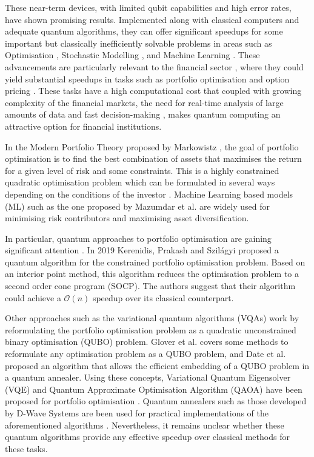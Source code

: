 \documentclass[prx,twocolumn,floatfix,superscriptaddress,longbibliography]{revtex4-1}
\begin{document}
These near-term devices, with limited qubit capabilities and high error rates, have shown promising results. Implemented along with classical computers and adequate quantum algorithms, they can offer significant speedups for some important but classically inefficiently solvable problems in areas such as Optimisation \cite{Symons2023}, Stochastic Modelling \cite{Herbert2022}, and Machine Learning \cite{Zeguendry2023}. These advancements are particularly relevant to the financial sector \cite{Egger2020a}, where they could yield substantial speedups in tasks such as portfolio optimisation and option pricing \cite{Hassija2020}. These tasks have a high 
computational cost that coupled with growing complexity of the financial markets, the need for real-time analysis of large amounts of data and fast decision-making \cite{book:2139036}, makes quantum computing 
an attractive option for financial institutions. 

In the Modern Portfolio Theory proposed by Markowistz \cite{Wilmott2007}, the goal of portfolio optimisation is to find the best combination of assets that maximises the return for a given level of risk and some constraints. This is a highly constrained quadratic optimisation problem which can be formulated in several ways depending on the conditions of the 
investor \cite{Herman2022}. Machine Learning based models (ML) such as the one proposed by Mazumdar et al. \cite{Mazumdar2020} are widely used for minimising risk contributors and maximising asset diversification.

In particular, quantum approaches to portfolio optimisation are gaining significant attention \cite{Quarterly2020}. In 2019 Kerenidis, Prakash and Szilágyi proposed a quantum algorithm for the constrained portfolio optimisation problem. Based on an interior point method, this algorithm reduces the optimisation problem to a second order cone program (SOCP). The authors suggest that their algorithm could achieve a $\mathcal{O} (n)$ speedup over  its classical counterpart.

Other approaches such as the variational quantum algorithms (VQAs) \cite{Yuan2019, Cerezo2021, McClean2016, Amaro2022} work by reformulating the portfolio optimisation problem as a 
quadratic unconstrained binary optimisation (QUBO) problem. Glover et al. \cite{Glover2019} covers some methods to reformulate any optimisation problem as a QUBO problem, and Date et al. \cite{Date2019} proposed an algorithm that allows the efficient embedding of a QUBO problem in a quantum annealer.  Using these concepts, Variational Quantum 
Eigensolver (VQE) \cite{Huang2023, McClean2016, Peruzzo2014, Barkoutsos2020} and Quantum Approximate Optimisation Algorithm (QAOA) \cite{Farhi2014, Blekos2024} have been proposed for portfolio optimisation \cite{Egger2020}. Quantum annealers such as those developed by D-Wave Systems \cite{King2023} are been used for practical implementations of the aforementioned algorithms
\cite{Phillipson2020, Venturelli2019}. Nevertheless, it remains unclear whether these quantum algorithms provide any effective speedup over classical methods for these tasks.
\end{document}
